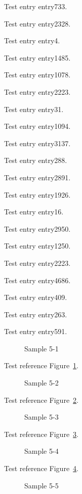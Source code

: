 Test entry \gls{entry733}.

Test entry \gls{entry2328}.

Test entry \gls{entry4}.

Test entry \gls{entry1485}.

Test entry \gls{entry1078}.

Test entry \gls{entry2223}.

Test entry \gls{entry31}.

Test entry \gls{entry1094}.

Test entry \gls{entry3137}.

Test entry \gls{entry288}.

Test entry \gls{entry2891}.

Test entry \gls{entry1926}.

Test entry \gls{entry16}.

Test entry \gls{entry2950}.

Test entry \gls{entry1250}.

Test entry \gls{entry2223}.

Test entry \gls{entry4686}.

Test entry \gls{entry409}.

Test entry \gls{entry263}.

Test entry \gls{entry591}.

\begin{figure}[tbhp]
\caption{Sample 5-1}
\label{fig:sample-5-1}
\end{figure}

Test reference Figure~\ref{fig:sample-5-1}.

\begin{figure}[tbhp]
\caption{Sample 5-2}
\label{fig:sample-5-2}
\end{figure}

Test reference Figure~\ref{fig:sample-5-2}.

\begin{figure}[tbhp]
\caption{Sample 5-3}
\label{fig:sample-5-3}
\end{figure}

Test reference Figure~\ref{fig:sample-5-3}.

\begin{figure}[tbhp]
\caption{Sample 5-4}
\label{fig:sample-5-4}
\end{figure}

Test reference Figure~\ref{fig:sample-5-4}.

\begin{figure}[tbhp]
\caption{Sample 5-5}
\label{fig:sample-5-5}
\end{figure}

